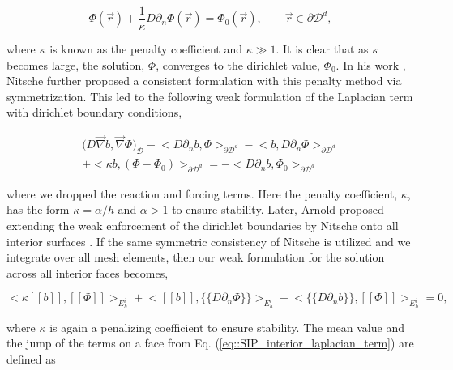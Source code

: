 \begin{equation}
\label{eq::penalty_boundary_term}
\Phi (\vec{r}) +\frac{1}{\kappa} D \partial_n \Phi (\vec{r}) = \Phi_0 (\vec{r}), \qquad \vec{r} \in \partial \mathcal{D}^d, 
\end{equation}

\noindent where $\kappa$ is known as the penalty coefficient and $\kappa \gg 1$. It is clear that as $\kappa$ becomes large, the solution, $\Phi$, converges to the dirichlet value, $\Phi_0$. In his work \cite{ref::nitsche_IP}, Nitsche further proposed a consistent formulation with this penalty method via symmetrization. This led to the following weak formulation of the Laplacian term with dirichlet boundary conditions,

\begin{equation}
\label{eq::SIP_boundary_laplacian_term}
\begin{aligned}
\Big(  D \vec{\nabla}  b , \vec{\nabla} \Phi  \Big)_{\mathcal{D}} - \Big<   D \partial_n b, \Phi \Big>_{\partial \mathcal{D}^d} - \Big<  b, D \partial_n \Phi \Big>_{\partial \mathcal{D}^d} \\ + \Big< \kappa b,  (\Phi - \Phi_0) \Big>_{\partial \mathcal{D}^d} = - \Big< D \partial_n b ,  \Phi_0 \Big>_{\partial \mathcal{D}^d} 
\end{aligned}
\end{equation}

\noindent where we dropped the reaction and forcing terms. Here the penalty coefficient, $\kappa$, has the form $\kappa = \alpha / h$ and $\alpha > 1$ to ensure stability. Later, Arnold proposed extending the weak enforcement of the dirichlet boundaries by Nitsche onto all interior surfaces \cite{ref::arnold_1982_IP}. If the same symmetric consistency of Nitsche is utilized and we integrate over all mesh elements, then our weak formulation for the solution across all interior faces becomes,

\begin{equation}
\label{eq::SIP_interior_laplacian_term}
\Big< \kappa [\![   b ]\!] , [\![  \Phi ]\!]\Big>_{E_h^i} + \Big<  [\![   b ]\!] , \{\!\{  D \partial_n \Phi \}\!\}\Big>_{E_h^i} + \Big< \{\!\{  D \partial_n  b \}\!\} , [\![  \Phi ]\!]\Big>_{E_h^i} = 0 ,
\end{equation}

\noindent where $\kappa$ is again a penalizing coefficient to ensure stability. The mean value and the jump of the terms on a face from Eq. (\ref{eq::SIP_interior_laplacian_term}) are defined as

